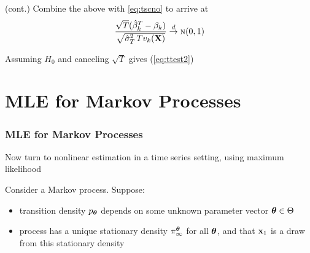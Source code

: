 \begin{frame}

    \vspace{2em}
    \Prf (cont.)
    Combine the above with \eqref{eq:tscno} to arrive at
    \begin{equation*}
        \frac{\sqrt{T} (\hat \beta_k^T - \beta_k)}
        {\sqrt{\hat \sigma_T^2 \, T v_k(\mathbf X)}}
        \stackrel { d } {\to} 
            \textrm{\sc n}(0, 1)
    \end{equation*}
    
    \vspace{.7em}
    Assuming $H_0$ and canceling $\sqrt{T}$ gives (\ref{eq:ttest2})\qedsymbol
    
\end{frame}

\section{MLE for Markov Processes}

\begin{frame}\frametitle{MLE for Markov Processes}

    \vspace{2em}
    Now turn to nonlinear estimation in a time series setting, using
    maximum likelihood
    
    \vspace{.7em}
    Consider a Markov process. Suppose:
    \begin{itemize}
        \item transition
        density $p_{{\boldsymbol \theta}}$ depends on some unknown parameter vector ${\boldsymbol \theta}
        \in \Theta$
        \item process has a unique stationary density
            $\pi_{\infty}^{{\boldsymbol \theta}}$ for all ${\boldsymbol \theta}$, and that ${\mathbf x}_1$ is a draw from
            this stationary density
    \end{itemize}

\end{frame}

